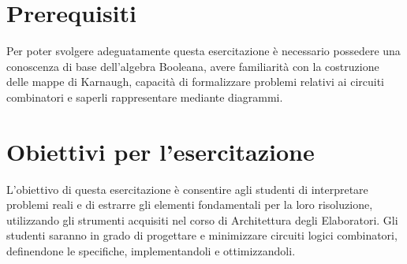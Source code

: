 \section{Prerequisiti}
Per poter svolgere adeguatamente questa esercitazione è necessario possedere una conoscenza di base dell'algebra Booleana, avere familiarità con la costruzione delle mappe di Karnaugh, capacità di formalizzare problemi relativi ai circuiti combinatori e saperli rappresentare mediante diagrammi.

\section{Obiettivi per l'esercitazione}
L'obiettivo di questa esercitazione è consentire agli studenti di interpretare problemi reali e di estrarre gli elementi fondamentali per la loro risoluzione, utilizzando gli strumenti acquisiti nel corso di Architettura degli Elaboratori. Gli studenti saranno in grado di progettare e minimizzare circuiti logici combinatori, definendone le specifiche, implementandoli e ottimizzandoli.